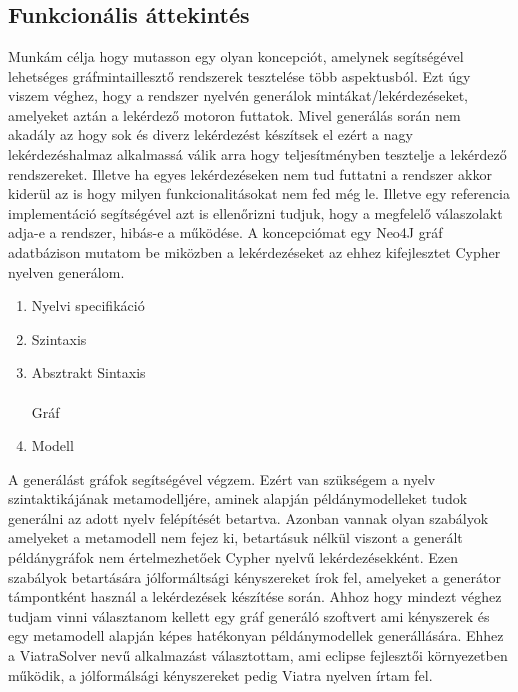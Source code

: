 \chapter{\attekintes}

\section{Funkcionális áttekintés}

Munkám célja hogy mutasson egy olyan koncepciót, amelynek segítségével lehetséges gráfmintaillesztő
 rendszerek tesztelése több aspektusból. Ezt úgy viszem véghez, hogy a rendszer nyelvén generálok
 mintákat/lekérdezéseket, amelyeket aztán a lekérdező motoron futtatok. Mivel generálás során nem 
 akadály az hogy sok és diverz lekérdezést készítsek el ezért a nagy lekérdezéshalmaz alkalmassá válik
 arra hogy teljesítményben tesztelje a lekérdező rendszereket. Illetve ha egyes lekérdezéseken nem tud
 futtatni a rendszer akkor kiderül az is hogy milyen funkcionalitásokat nem fed még le. Illetve egy 
 referencia implementáció segítségével azt is ellenőrizni tudjuk, hogy a megfelelő válaszolakt adja-e
 a rendszer, hibás-e a működése. A koncepciómat egy Neo4J \cite{neo4j} gráf adatbázison mutatom be 
 miközben a lekérdezéseket az ehhez kifejlesztet Cypher \cite{Cypher} nyelven generálom.
 
\begin{enumerate}
	\item Nyelvi specifikáció
	\item Szintaxis
	\item Absztrakt Sintaxis \\
	\\
	Gráf
	\item Modell 
\end{enumerate}
 
A generálást gráfok segítségével végzem. Ezért van szükségem a nyelv szintaktikájának metamodelljére,
aminek alapján példánymodelleket tudok generálni az adott nyelv felépítését betartva. Azonban vannak 
olyan szabályok amelyeket a metamodell nem fejez ki, betartásuk nélkül viszont a generált példánygráfok
nem értelmezhetőek Cypher nyelvű lekérdezésekként. Ezen szabályok betartására jólformáltsági kényszereket 
írok fel, amelyeket a generátor támpontként használ a lekérdezések készítése során. Ahhoz hogy mindezt 
véghez tudjam vinni választanom kellett egy gráf generáló szoftvert ami kényszerek és egy metamodell
alapján képes hatékonyan példánymodellek generállására. Ehhez a ViatraSolver nevű alkalmazást választottam,
ami eclipse fejlesztői környezetben működik, a jólformálsági kényszereket pedig Viatra nyelven írtam fel.

